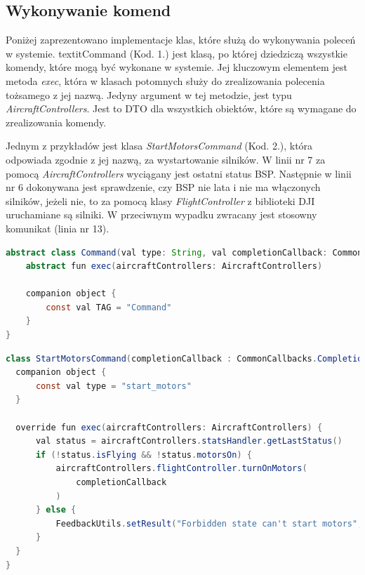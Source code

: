 \subsection{Wykonywanie komend}

Poniżej zaprezentowano implementacje klas, które służą do wykonywania poleceń w systemie. textit{Command} (Kod. 1.) jest klasą, po której dziedziczą wszystkie komendy, które mogą być wykonane w systemie. Jej kluczowym elementem jest metoda \textit{exec}, która w klasach potomnych służy do zrealizowania polecenia tożsamego z jej nazwą. Jedyny argument w tej metodzie, jest typu \textit{AircraftControllers}. Jest to DTO dla wszystkich obiektów, które są wymagane do zrealizowania komendy.

Jednym z przykładów jest klasa \textit{StartMotorsCommand} (Kod. 2.), która odpowiada zgodnie z jej nazwą, za wystartowanie silników. W linii nr 7 za pomocą \textit{AircraftControllers} wyciągany jest ostatni status BSP. Następnie w linii nr 6 dokonywana jest sprawdzenie, czy BSP nie lata i nie ma włączonych silników, jeżeli nie, to za pomocą klasy \textit{FlightController} z biblioteki DJI uruchamiane są silniki. W przeciwnym wypadku zwracany jest stosowny komunikat (linia nr 13).



\begin{lstlisting}[language=Java, caption=Klasa \textit{Command}]
  abstract class Command(val type: String, val completionCallback: CommonCallbacks.CompletionCallback<DJIError>) {
    abstract fun exec(aircraftControllers: AircraftControllers)

    companion object {
        const val TAG = "Command"
    }
}
\end{lstlisting}

\begin{lstlisting}[language=Java, caption=Klasa \textit{StartMotorsCommand}]
class StartMotorsCommand(completionCallback : CommonCallbacks.CompletionCallback<DJIError>) : Command(type, completionCallback) {
  companion object {
      const val type = "start_motors"
  }

  override fun exec(aircraftControllers: AircraftControllers) {
      val status = aircraftControllers.statsHandler.getLastStatus()
      if (!status.isFlying && !status.motorsOn) {
          aircraftControllers.flightController.turnOnMotors(
              completionCallback
          )
      } else {
          FeedbackUtils.setResult("Forbidden state can't start motors", TAG)
      }
  }
}
\end{lstlisting}

